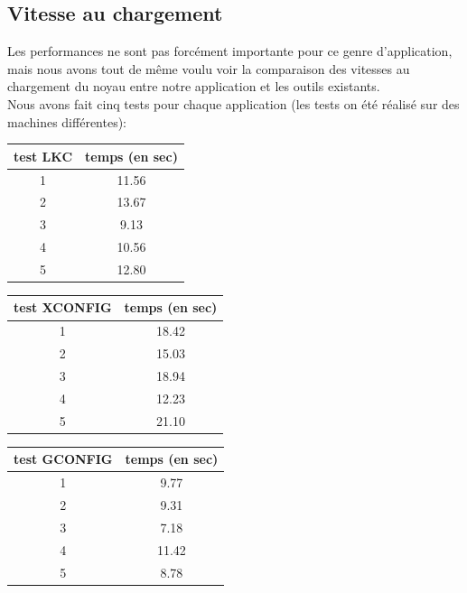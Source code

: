 \documentclass[17pts]{report}
\begin{document}
\subsection{Vitesse au chargement}
\label{sub:Vitesse au chargement}

Les performances ne sont pas forcément importante pour ce genre d'application,
mais nous avons tout de même voulu voir la comparaison des vitesses au
chargement du noyau entre notre application et les outils existants.\\

Nous avons fait cinq tests pour chaque application (les tests on été réalisé
sur des machines différentes):

\begin{tabular}{|c|c|}
\hline
test LKC & temps (en sec) \\
\hline
\hline
1 & 11.56 \\
\hline
2 & 13.67 \\
\hline
3 & 9.13 \\
\hline
4 & 10.56 \\
\hline
5 & 12.80 \\
\hline
\end{tabular}
\newline
\newline

\begin{tabular}{|c|c|}
\hline
test XCONFIG & temps (en sec) \\
\hline
\hline
1 & 18.42 \\
\hline
2 & 15.03 \\
\hline
3 & 18.94 \\
\hline
4 & 12.23 \\
\hline
5 & 21.10 \\
\hline
\end{tabular}
\newline
\newline

\begin{tabular}{|c|c|}
\hline
test GCONFIG & temps (en sec) \\
\hline
\hline
1 & 9.77 \\
\hline
2 & 9.31 \\
\hline
3 & 7.18 \\
\hline
4 & 11.42 \\
\hline
5 & 8.78 \\
\hline
\end{tabular}
\end{document}

